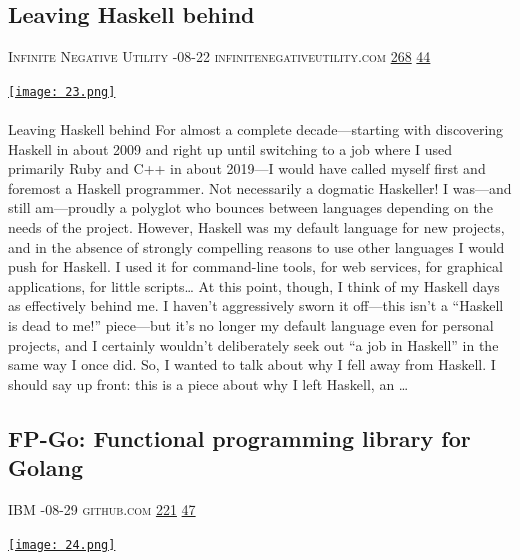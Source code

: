 \documentclass[10pt,a4paper]{article}
\begin{document}
\begin{multicols}{2}
\begin{minipage}{\linewidth}
\subsection{Leaving Haskell behind}
\textsc{\footnotesize
{\scriptsize\faUser}\space 
Infinite Negative Utility 
{\scriptsize\faCalendar}-08-22 
{\scriptsize\faGlobe}\space 
infinitenegativeutility.com 
{\scriptsize\faThumbsOUp}\space 
\href{http://news.ycombinator.com/item?id=37246932\&utm\_term=comment}{268} 
{\scriptsize\faComments}\space 
\href{http://news.ycombinator.com/item?id=37246932\&utm\_term=comment}{44} 
}
\par\medskip\noindent
\href{https://journal.infinitenegativeutility.com/leaving-haskell-behind?utm\_source=hackernewsletter\&utm\_medium=email\&utm\_term=code}{
    \texttt{[image: 23.png]}
}
\end{minipage}
\paragraph{}
Leaving Haskell behind
For almost a complete decade—starting with discovering Haskell in about 2009 and right up until switching to a job where I used primarily Ruby and C++ in about 2019—I would have called myself first and foremost a Haskell programmer.
Not necessarily a dogmatic Haskeller! I was—and still am—proudly a polyglot who bounces between languages depending on the needs of the project. However, Haskell was my default language for new projects, and in the absence of strongly compelling reasons to use other languages I would push for Haskell. I used it for command-line tools, for web services, for graphical applications, for little scripts…
At this point, though, I think of my Haskell days as effectively behind me. I haven't aggressively sworn it off—this isn't a “Haskell is dead to me!” piece—but it's no longer my default language even for personal projects, and I certainly wouldn't deliberately seek out “a job in Haskell” in the same way I once did.
So, I wanted to talk about why I fell away from Haskell. I should say up front: this is a piece about why I left Haskell, an
\dots\par
\noindent\begin{minipage}{\linewidth}
\medskip
\subsection{FP-Go: Functional programming library for Golang}
\textsc{\footnotesize
{\scriptsize\faUser}\space 
IBM 
{\scriptsize\faCalendar}-08-29 
{\scriptsize\faGithub}\space 
github.com 
{\scriptsize\faThumbsOUp}\space 
\href{http://news.ycombinator.com/item?id=37171149\&utm\_term=comment}{221} 
{\scriptsize\faComments}\space 
\href{http://news.ycombinator.com/item?id=37171149\&utm\_term=comment}{47} 
}
\par\medskip\noindent
\href{https://github.com/IBM/fp-go?utm\_source=hackernewsletter\&utm\_medium=email\&utm\_term=code}{
    \texttt{[image: 24.png]}
}
\end{minipage}

\end{multicols}
\end{document}
